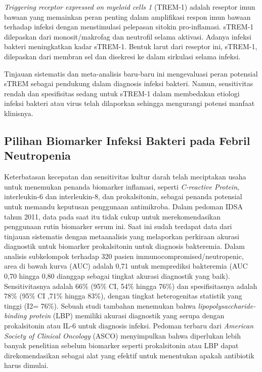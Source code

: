 \documentclass[
  10pt,
  letterpaper,
]{article}
\begin{document}
\emph{Triggering receptor expressed on myeloid cells 1} (TREM-1) adalah
reseptor imun bawaan yang memainkan peran penting dalam amplifikasi
respon imun bawaan terhadap infeksi dengan menstimulasi pelepasan
sitokin pro-inflamasi.\citep{Smok2020} sTREM-1 dilepaskan dari
monosit/makrofag dan neutrofil selama aktivasi. Adanya infeksi bakteri
meningkatkan kadar sTREM-1. Bentuk larut dari reseptor ini, sTREM-1,
dilepaskan dari membran sel dan disekresi ke dalam sirkulasi selama
infeksi.\citep{Esposito2016, Balanza2020}

Tinjauan sistematis dan meta-analisis baru-baru ini mengevaluasi peran
potensial sTREM sebagai pendukung dalam diagnosis infeksi bakteri.
Namun, sensitivitas rendah dan spesifisitas sedang untuk sTREM-1 dalam
membedakan etiologi infeksi bakteri atau virus telah dilaporkan sehingga
mengurangi potensi manfaat klinisnya.\citep{Esposito2016}

\subsection{Pilihan Biomarker Infeksi Bakteri pada Febril
Neutropenia}\label{pilihan-biomarker-infeksi-bakteri-pada-febril-neutropenia}

Keterbatasan kecepatan dan sensitivitas kultur darah telah meciptakan
usaha untuk menemukan penanda biomarker inflamasi, seperti
\emph{C-reactive Protein}, interleukin-6 dan interleukin-8, dan
prokalsitonin, sebagai penanda potensial untuk memandu keputusan
penggunaan antimikroba.\citep{taplitz2018} Dalam pedoman IDSA tahun
2011, data pada saat itu tidak cukup untuk merekomendasikan penggunaan
rutin biomarker serum ini.\citep{Freifeld2011} Saat ini sudah terdapat
data dari tinjauan sistematis dengan metaanalisis yang melaporkan
perkiraan akurasi diagnostik untuk biomarker prokalsitonin untuk
diagnosis bakteremia.\citep{Hoeboer2015} Dalam analisis subkelompok
terhadap 320 pasien immunocompromised/neutropenic, area di bawah kurva
(AUC) adalah 0,71 untuk memprediksi bakteremia (AUC 0,70 hingga 0,80
dianggap sebagai tingkat akurasi diagnostik yang baik). Sensitivitasnya
adalah 66\% (95\% CI, 54\% hingga 76\%) dan spesifisitasnya adalah 78\%
(95\% CI ,71\% hingga 83\%), dengan tingkat heterogenitas statistik yang
tinggi (I2= 76\%). Sebuah studi tambahan menemukan bahwa
\emph{lipopolysaccharide-binding protein} (LBP) memiliki akurasi
diagnostik yang serupa dengan prokalsitonin atau IL-6 untuk diagnosis
infeksi.\citep{García2015} Pedoman terbaru dari \emph{American Society
of Clinical Oncology} (ASCO) menyimpulkan bahwa diperlukan lebih banyak
penelitian sebelum biomarker seperti prokalsitonin atau LBP dapat
direkomendasikan sebagai alat yang efektif untuk menentukan apakah
antibiotik harus dimulai.\citep{taplitz2018}
\end{document}
